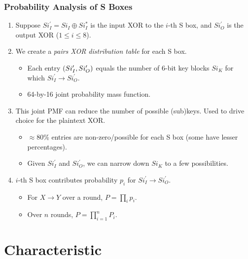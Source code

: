 \documentclass{beamer}
\begin{document}
	\begin{frame}
		\frametitle{Probability Analysis of S Boxes}
		\begin{enumerate}
			\item Suppose \(Si_I^\prime = Si_I \oplus Si_I^*\) is the input XOR
			to the \(i\)-th S box, and \(Si_O^\prime\) is the output XOR (\(1
			\le i \le 8\)).
			\item<2-> We create a \emph{pairs XOR distribution table} for each S
			box.
			\begin{itemize}
				\item Each entry \((Si_I^\prime, Si_O^\prime)\) equals the
				number of 6-bit key blocks \(Si_K\) for which \(Si_I^\prime
				\rightarrow Si_O^\prime\).
				\item 64-by-16 joint probability mass function.
			\end{itemize}
			\item<3-> This joint PMF can reduce the number of possible
			(sub)keys. Used to drive choice for the plaintext XOR.
			\begin{itemize}
				\item \(\approx 80\%\) entries are non-zero/possible for each S
				box (some have lesser percentages).
				\item Given \(Si_I^\prime\) and \(Si_O^\prime\), we can narrow
				down \(Si_K\) to a few possibilities.
			\end{itemize}
			\item<4-> \(i\)-th S box contributes probability \(p_i\) for
			\(Si_I^\prime \rightarrow Si_O^\prime\). 
			\begin{itemize}
				\item For \(X \rightarrow Y\) over a round, \(P = \prod_i p_i\).
				\item Over \(n\) rounds, \(P = \prod_{i=1}^n P_i\).
			\end{itemize}
		\end{enumerate}
	\end{frame}

	\section{Characteristic}
\end{document}
